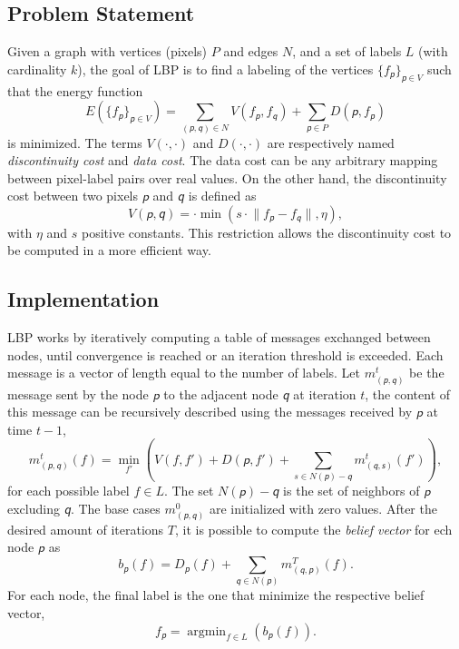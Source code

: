 \documentclass[notitlepage,english]{hgbreport}
\newcommand{\Acronym}[1]{{#1}}
\newcommand{\LBP}{\Acronym{LBP}}
\renewcommand{\vec}[1]{\bm{\mathsfit{#1}}}
\DeclareMathOperator*{\argmin}{argmin}
\begin{document}
\subsection{Problem Statement}
Given a graph with vertices (pixels) $P$ and edges $N$, and a set of
labels $L$ (with cardinality $k$), the goal of \LBP{} is to find a 
labeling of the vertices $\{f_{\vec p}\}_{\vec p \in V}$ such that 
the energy function
\begin{equation}\label{eq:lbp:energy}
E\left( \{f_{\vec p}\}_{\vec p \in V}\right) = 
\sum_{(\vec p,\vec q)\in N} V(f_{\vec p},f_{\vec q}) + \sum_{\vec p \in P}  D(\vec p, f_{\vec p})
\end{equation}
is minimized. The terms $V(\cdot,\cdot)$ and $D(\cdot,\cdot)$
are respectively named \emph{discontinuity cost} and \emph{data cost}.
The {data cost} can be any arbitrary mapping between pixel-label pairs
over real values.
On the other hand, the discontinuity cost between two pixels $\vec p$
and $\vec q$ is defined as
\begin{equation}\label{eq:lbp:discontinuity}
V(\vec p, \vec q) = \cdot\min(s \cdot \lVert f_{\vec p} - f_{\vec q}\rVert, \eta),
\end{equation}
with $\eta$ and $s$ positive constants. This restriction allows the discontinuity cost to be computed in a more efficient way.

\subsection{Implementation}
\LBP{} works by iteratively computing a table of messages exchanged between nodes, until convergence is reached or an iteration threshold is exceeded. Each message is a vector of length equal to the number of labels.
Let $m^t_{(\vec p,\vec q)}$ be the message sent by the node $\vec p$ to the adjacent node $\vec q$ at iteration $t$, the content of this message can be recursively described using the messages received by $\vec p$ at time $t-1$, \ie
\begin{equation}\label{eq:lbp:update}
m^t_{(\vec p,\vec q)}(f) = \min_{f'}\left( V(f, f') + D(\vec p, f') + \sum_{s\in N(\vec p) - \vec q} m^t_{(\vec q, \vec s)}(f')\right),
\end{equation}
for each possible label $f\in L$. The set $N(\vec p)-\vec q$ is the set of neighbors of $\vec p$ excluding $\vec q$. The base cases $m^0_{(\vec p,\vec q)}$ are initialized with zero values.
After the desired amount of iterations $T$, it is possible to compute the \emph{belief vector} for ech node $\vec p$ as
$$
b_{\vec p}(f) = D_{\vec p}(f) + \sum_{\vec q\in N(\vec p)} m^T_{(\vec q, \vec p)}(f).
$$
For each node, the final label is the one that minimize the respective belief vector, \ie
$$
f_{\vec p} = \argmin_{f\in L}\left(b_{\vec p}(f)\right).
$$
\end{document}
